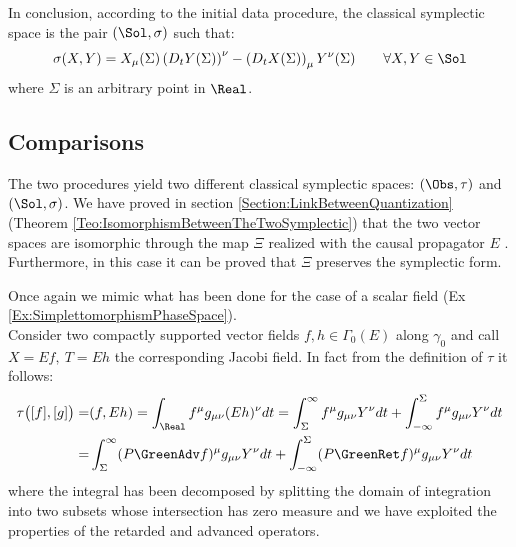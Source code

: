 \documentclass[Main]{subfiles}
\begin{document}
				\vspace{3.5mm}
				In conclusion, according to the initial data procedure,  the classical symplectic space is the pair $(\Sol, \sigma)$ such that:
				\begin{displaymath}
					\sigma( X, Y) = X_\mu(\Sigma) \left( D_t Y (\Sigma)\right)^\nu - \left(D_t X(\Sigma)\right)_\mu Y^\nu(\Sigma) \qquad \forall X,Y \in \Sol
				\end{displaymath}
				where $\Sigma$ is an arbitrary point in $\Real$.

	\subsection{Comparisons}
		The two procedures yield two different classical symplectic spaces: $(\Obs,\tau)$ and $(\Sol, \sigma)$.
		We have proved in section \ref{Section:LinkBetweenQuantization} (Theorem \ref{Teo:IsomorphismBetweenTheTwoSymplectic}) that the two vector spaces are isomorphic through the map $\Xi$ realized with the causal propagator $E$ .
		Furthermore, in this case it can be proved that $\Xi$ preserves the symplectic form.
		
		Once again we mimic what has been done for the case of a scalar field (Ex \ref{Ex:SimplettomorphismPhaseSpace}).\\
		Consider two compactly supported vector fields $f,h \in \Gamma_0(E)$ along $\gamma_0$	and call $X= Ef,\: T = Eh$ the corresponding Jacobi field.
		In fact from the definition of $\tau$ it follows:
		\begin{align}
			\tau\big( [f], [g] \big) =& (f, Eh) = \int_\Real f^\mu g_{\mu \nu} ( E h)^\nu dt =
					\int_\Sigma^\infty  f^\mu g_{\mu \nu} Y^\nu dt	 + 
					\int_{-\infty}^\Sigma  f^\mu g_{\mu \nu} Y^\nu dt
			\nonumber \\
			=& \int_\Sigma^\infty (P \GreenAdv f)^\mu g_{\mu \nu} Y^\nu dt	 + 
					\int_{-\infty}^\Sigma (P \GreenRet f)^\mu g_{\mu \nu} Y^\nu dt
		\end{align}
		where the integral has been decomposed by splitting the domain of integration into two subsets whose intersection has zero measure and we have exploited the properties of the retarded and advanced operators.
\end{document}
